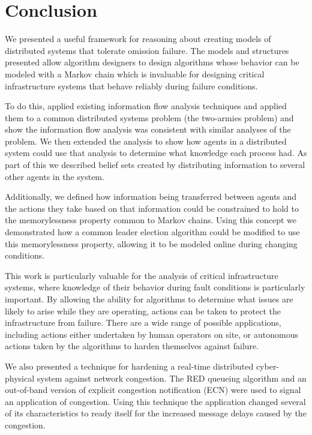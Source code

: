 
\chapter{Conclusion}

We presented a useful framework for reasoning about creating models of distributed systems that tolerate omission failure.
The models and structures presented allow algorithm designers to design algorithms whose behavior can be modeled with a Markov chain which is invaluable for designing critical infrastructure systems that behave reliably during failure conditions.

To do this, applied existing information flow analysis techniques and applied them to a common distributed systems problem (the two-armies problem) and show the information flow analysis was consistent with similar analyses of the problem.
We then extended the analysis to show how agents in a distributed system could use that analysis to determine what knowledge each process had.
As part of this we described belief sets created by distributing information to several other agents in the system.

Additionally, we defined how information being transferred between agents and the actions they take based on that information could be constrained to hold to the memorylessness property common to Markov chains.
Using this concept we demonstrated how a common leader election algorithm could be modified to use this memorylessness property, allowing it to be modeled online during changing conditions.

This work is particularly valuable for the analysis of critical infrastructure systems, where knowledge of their behavior during fault conditions is particularly important.
By allowing the ability for algorithms to determine what issues are likely to arise while they are operating, actions can be taken to protect the infrastructure from failure.
There are a wide range of possible applications, including actions either undertaken by human operators on site, or autonomous actions taken by the algorithms to harden themselves against failure.

We also presented a technique for hardening a real-time distributed cyber-physical system against network congestion.
The \ac{RED} queueing algorithm and an out-of-band version of explicit congestion notification (ECN) were used to signal an application of congestion.
Using this technique the application changed several of its characteristics to ready itself for the increased message delays caused by the congestion.

